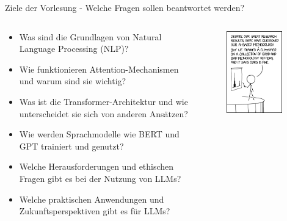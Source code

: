 \documentclass[aspectratio=1610, xcolor=dvipsnames, 9pt]{beamer}
\begin{document}
\begin{frame}{Ziele der Vorlesung - Welche Fragen sollen beantwortet werden?}
  \begin{columns}
    \begin{column}{0.69\textwidth}
      \begin{itemize}
        \item Was sind die Grundlagen von Natural Language Processing (NLP)? \newline
        \item Wie funktionieren Attention-Mechanismen und warum sind sie wichtig? \newline
        \item Was ist die Transformer-Architektur und wie unterscheidet sie sich von anderen Ansätzen? \newline
        \item Wie werden Sprachmodelle wie BERT und GPT trainiert und genutzt? \newline
        \item Welche Herausforderungen und ethischen Fragen gibt es bei der Nutzung von LLMs? \newline
        \item Welche praktischen Anwendungen und Zukunftsperspektiven gibt es für LLMs? \newline
      \end{itemize}
    \end{column}
    \begin{column}{0.3\textwidth}
 \begin{figure}
 \centering
             \includegraphics[width=0.9\textwidth]{images/ai_methodology.png}

\end{figure}
\end{column}
\end{columns}
\end{frame}
\end{document}
